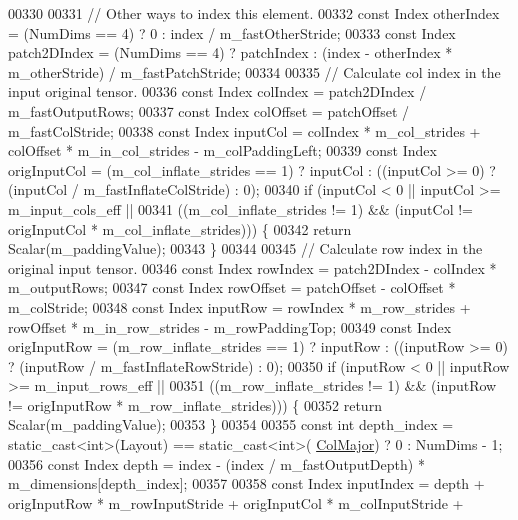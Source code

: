 \begin{DoxyCode}
00330 
00331     \textcolor{comment}{// Other ways to index this element.}
00332     \textcolor{keyword}{const} Index otherIndex = (NumDims == 4) ? 0 : index / m\_fastOtherStride;
00333     \textcolor{keyword}{const} Index patch2DIndex = (NumDims == 4) ? patchIndex : (index - otherIndex * m\_otherStride) / 
      m\_fastPatchStride;
00334 
00335     \textcolor{comment}{// Calculate col index in the input original tensor.}
00336     \textcolor{keyword}{const} Index colIndex = patch2DIndex / m\_fastOutputRows;
00337     \textcolor{keyword}{const} Index colOffset = patchOffset / m\_fastColStride;
00338     \textcolor{keyword}{const} Index inputCol = colIndex * m\_col\_strides + colOffset * m\_in\_col\_strides - m\_colPaddingLeft;
00339     \textcolor{keyword}{const} Index origInputCol = (m\_col\_inflate\_strides == 1) ? inputCol : ((inputCol >= 0) ? (inputCol / 
      m\_fastInflateColStride) : 0);
00340     \textcolor{keywordflow}{if} (inputCol < 0 || inputCol >= m\_input\_cols\_eff ||
00341         ((m\_col\_inflate\_strides != 1) && (inputCol != origInputCol * m\_col\_inflate\_strides))) \{
00342       \textcolor{keywordflow}{return} Scalar(m\_paddingValue);
00343     \}
00344 
00345     \textcolor{comment}{// Calculate row index in the original input tensor.}
00346     \textcolor{keyword}{const} Index rowIndex = patch2DIndex - colIndex * m\_outputRows;
00347     \textcolor{keyword}{const} Index rowOffset = patchOffset - colOffset * m\_colStride;
00348     \textcolor{keyword}{const} Index inputRow = rowIndex * m\_row\_strides + rowOffset * m\_in\_row\_strides - m\_rowPaddingTop;
00349     \textcolor{keyword}{const} Index origInputRow = (m\_row\_inflate\_strides == 1) ? inputRow : ((inputRow >= 0) ? (inputRow / 
      m\_fastInflateRowStride) : 0);
00350     \textcolor{keywordflow}{if} (inputRow < 0 || inputRow >= m\_input\_rows\_eff ||
00351         ((m\_row\_inflate\_strides != 1) && (inputRow != origInputRow * m\_row\_inflate\_strides))) \{
00352       \textcolor{keywordflow}{return} Scalar(m\_paddingValue);
00353     \}
00354 
00355     \textcolor{keyword}{const} \textcolor{keywordtype}{int} depth\_index = \textcolor{keyword}{static\_cast<}\textcolor{keywordtype}{int}\textcolor{keyword}{>}(Layout) == static\_cast<int>(
      \hyperlink{group__enums_ggaacded1a18ae58b0f554751f6cdf9eb13a0cbd4bdd0abcfc0224c5fcb5e4f6669a}{ColMajor}) ? 0 : NumDims - 1;
00356     \textcolor{keyword}{const} Index depth = index - (index / m\_fastOutputDepth) * m\_dimensions[depth\_index];
00357 
00358     \textcolor{keyword}{const} Index inputIndex = depth + origInputRow * m\_rowInputStride + origInputCol * m\_colInputStride + 

\end{DoxyCode}

